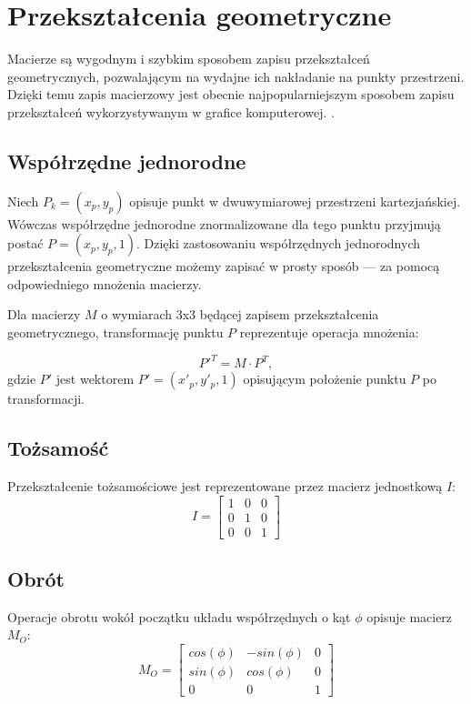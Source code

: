 \section{Przekształcenia geometryczne}
\label{part:macierze}
Macierze są wygodnym i szybkim sposobem zapisu przekształceń geometrycznych, pozwalającym na wydajne ich nakładanie na punkty przestrzeni. Dzięki temu zapis macierzowy jest obecnie najpopularniejszym sposobem zapisu przekształceń wykorzystywanym w grafice komputerowej. \cite{bib:smurf-geometria}. 

\subsection{Współrzędne jednorodne}
\label{part:wspolrzednejednorodne}
Niech $ P_k = (x_p, y_p) $ opisuje punkt w dwuwymiarowej przestrzeni kartezjańskiej. Wówczas współrzędne jednorodne znormalizowane dla tego punktu przyjmują postać $ P = (x_p, y_p, 1) $. Dzięki zastosowaniu współrzędnych jednorodnych przekształcenia geometryczne możemy zapisać w prosty sposób --- za pomocą odpowiedniego mnożenia macierzy. 

Dla macierzy $M$ o wymiarach 3x3 będącej zapisem przekształcenia geometrycznego, transformację punktu $P$ reprezentuje operacja mnożenia:

\begin{equation}
P'^T = M \cdot P^T,
\end{equation}
gdzie $P'$ jest wektorem $P' = (x'_p,y'_p, 1)$ opisującym położenie punktu $P$ po transformacji.

\subsection{Tożsamość}
Przekształcenie tożsamościowe jest reprezentowane przez macierz jednostkową $I$:
\begin{equation}
I = \left[ \begin{array}{ccc}
1 & 0 & 0 \\
0 & 1 & 0 \\
0 & 0 & 1
\end{array} \right]
\label{eq:macierz-jedn}
\end{equation}

\subsection{Obrót}
Operacje obrotu wokół początku układu współrzędnych o kąt $\phi$ opisuje macierz $M_O$:
\begin{equation}
M_O = \left[ \begin{array}{ccc}
cos(\phi) & -sin(\phi) & 0 \\
sin(\phi) & cos(\phi) & 0 \\
0 & 0 & 1
\end{array} \right]
\label{eq:macierz-obrot}
\end{equation}

